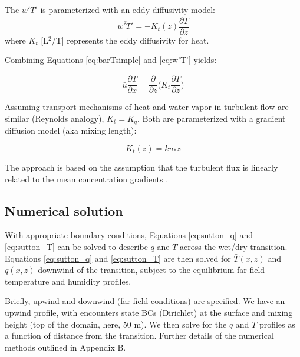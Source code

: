 \documentclass{article}
\begin{document}
    The $\overline {w'T'}$ is parameterized with an eddy diffusivity model:
    \begin{equation}  
    \label{eq:w'T'}
      \overline {w'T'} = - K_t(z) \frac{\partial \bar T}{\partial z} 
    \end{equation} 
    where  $K_t$ [L$^2$/T] represents the eddy diffusivity for heat.  

    Combining Equations \ref{eq:barTsimple} and \ref{eq:w'T'} yields: 

    \begin{equation}  
      \bar u  \frac{\partial \bar T}{\partial x}  =  
        \frac{\partial}{\partial z} \bigg(  K_t   \frac{\partial \bar T}{\partial z} \bigg)
        \label{eq:sutton_T}
    \end{equation}

    
    Assuming transport mechanisms of heat and water vapor in turbulent flow are similar (Reynolds analogy),  $K_t = K_q$.  Both are parameterized with a gradient diffusion model (aka mixing length):

    \begin{equation}
    K_t(z) = k u_* z
    \label{eq:K_q_mixing_length}
    \end{equation}

    The approach is based on the assumption that the turbulent flux is linearly related to the mean concentration gradients \cite{brutsaert2013evaporation}.

    \subsection*{Numerical solution}

    
    With appropriate boundary conditions, Equations \ref{eq:sutton_q} and \ref{eq:sutton_T} can be solved to describe $q$ ane $T$ across the wet/dry transition. 
    Equations \ref{eq:sutton_q} and \ref{eq:sutton_T} 
    are then solved for $\bar T(x, z)$ and $\bar q(x, z)$ downwind of the transition, subject to the equilibrium far-field temperature and humidity profiles. 

    Briefly, upwind and downwind (far-field conditions) are specified.  We have an upwind profile, with encounters  state BCs (Dirichlet) at the surface and mixing height (top of the domain, here, 50 m). We then solve for the $q$ and $T$ profiles as a function of distance from the transition. Further details of the numerical methods outlined in Appendix B.
\end{document}
